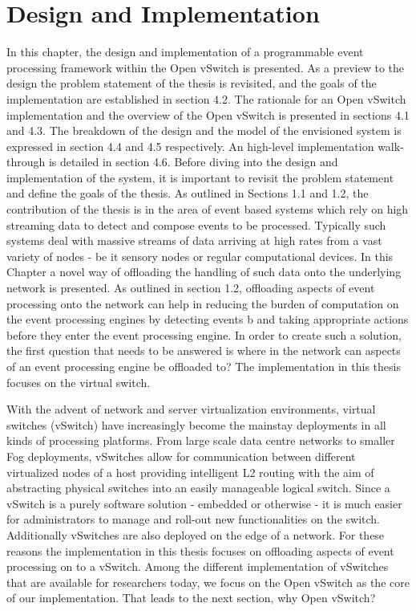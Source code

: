 \chapter{Design and Implementation}
In this chapter, the design and implementation of a programmable event processing framework within the Open vSwitch is presented. As a preview to the design the problem statement of the thesis is revisited, and the goals of the implementation are established in section 4.2. The rationale for an Open vSwitch implementation and the overview of the Open vSwitch is presented in sections 4.1 and 4.3. The breakdown of the design and the model of the envisioned system is expressed in section 4.4 and 4.5 respectively. An high-level implementation walk-through is detailed in section 4.6.
Before diving into the design and implementation of the system, it is important to revisit the problem statement and define the goals of the thesis. As outlined in Sections 1.1 and 1.2, the contribution of the thesis is in the area of event based systems which rely on high streaming data to detect and compose events to be processed. Typically such systems deal with massive streams of data arriving at high rates from a vast variety of nodes - be it sensory nodes or regular computational devices. In this Chapter a novel way of offloading the handling of such data onto the underlying network is presented. As outlined in section 1.2, offloading aspects of event processing onto the network can help in reducing the burden of computation on the event processing engines by detecting events b and taking appropriate actions before they enter the event processing engine. In order to create such a solution, the first question that needs to be answered is where in the network can aspects of an event processing engine be offloaded to? The implementation in this thesis focuses on the virtual switch.

With the advent of network and server virtualization environments, virtual switches (vSwitch) have increasingly become the mainstay deployments in all kinds of processing platforms. From large scale data centre networks to smaller Fog deployments, vSwitches allow for communication between different virtualized nodes of a host providing intelligent L2 routing with the aim of abstracting physical switches into an easily manageable logical switch. Since a vSwitch is a purely software solution - embedded or otherwise - it is much easier for administrators to manage and roll-out new functionalities on the switch. Additionally vSwitches are also deployed on the edge of a network. For these reasons the implementation in this thesis focuses on offloading aspects of event processing on to a vSwitch. Among the different implementation of vSwitches that are available for researchers today, we focus on the Open vSwitch as the core of our implementation. That leads to the next section, why Open vSwitch? 


